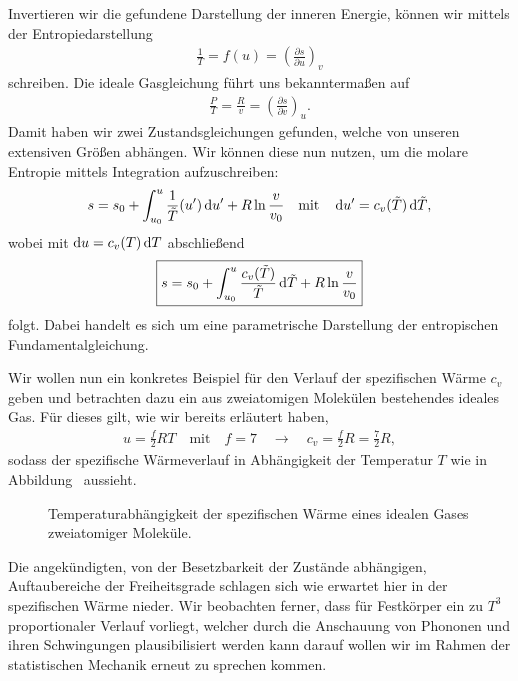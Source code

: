 Invertieren wir die gefundene Darstellung der inneren Energie, können wir mittels der Entropiedarstellung
\begin{align*}
    \frac{1}{T}=f(u)=\left(\frac{\partial s}{\partial u}\right)_v
\end{align*}
schreiben. Die ideale Gasgleichung führt uns bekanntermaßen auf
\begin{align*}
    \frac{P}{T}=\frac{R}{v}=\left(\frac{\partial s}{\partial v}\right)_u.
\end{align*}
Damit haben wir zwei Zustandsgleichungen gefunden, welche von unseren extensiven Größen abhängen.
Wir können diese nun nutzen, um die molare Entropie mittels Integration aufzuschreiben:
\begin{align*}
    s=s_0+\int_{u_0}^u\frac{1}{\Tilde{T}}(u')\mathop{}\!\mathrm{d} u'+R\ln\frac{v}{v_0}\quad\text{mit}\quad\mathop{}\!\mathrm{d} u'=c_v(\Tilde{T})\mathop{}\!\mathrm{d} \Tilde{T},
\end{align*}
wobei mit $\mathop{}\!\mathrm{d} u=c_v(T)\mathop{}\!\mathrm{d} T$ abschließend
\begin{align*}
    \boxed{s=s_0+\int_{u_0}^u\frac{c_v(\Tilde{T})}{\Tilde{T}}\mathop{}\!\mathrm{d} \Tilde{T}+R\ln\frac{v}{v_0}}
\end{align*}
folgt.
Dabei handelt es sich um eine parametrische Darstellung der entropischen Fundamentalgleichung.

Wir wollen nun ein konkretes Beispiel für den Verlauf der spezifischen Wärme $c_v$ geben und betrachten dazu ein aus zweiatomigen Molekülen bestehendes ideales Gas. Für dieses gilt, wie wir bereits erläutert haben,
\begin{align*}
    u=\frac{f}{2}RT\quad\text{mit}\quad f=7\quad\rightarrow\quad c_v=\frac{f}{2}R=\frac{7}{2}R,
\end{align*}
sodass der spezifische Wärmeverlauf in Abhängigkeit der Temperatur $T$ wie in Abbildung~ aussieht. 
\begin{figure}[htbp]
    \centering
    \tfigThawingOfDegreesOfFreedom
    \caption{Temperaturabhängigkeit der spezifischen Wärme eines idealen Gases zweiatomiger Moleküle.}
    \label{fig:ThawingOfDegreesOfFreedom}
\end{figure}

Die angekündigten, von der Besetzbarkeit der Zustände abhängigen, Auftaubereiche der Freiheitsgrade schlagen sich wie erwartet hier in der spezifischen Wärme nieder.
Wir beobachten ferner, dass für Festkörper ein zu $T^3$ proportionaler Verlauf vorliegt, welcher durch die Anschauung von Phononen und ihren Schwingungen plausibilisiert werden kann \textendash{} darauf wollen wir im Rahmen der statistischen Mechanik erneut zu sprechen kommen.


